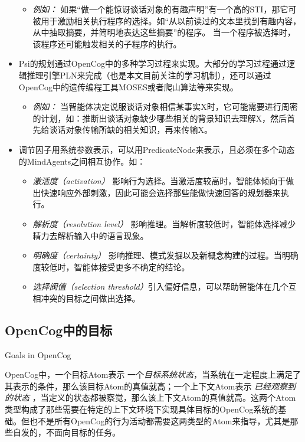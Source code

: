 \begin{itemize}
\begin{itemize}
\item {\it 例如：} 如果“做一个能惊讶谈话对象的有趣声明”有一个高的STI，那它可被用于激励相关执行程序的选择。如“从以前读过的文本里找到有趣内容，从中抽取摘要，并简明地表达这些摘要”的程序。 当一个程序被选择时，该程序还可能触发相关的子程序的执行。
\end{itemize}

\item Psi的规划通过OpenCog中的多种学习过程来实现。大部分的学习过程通过逻辑推理引擎PLN来完成（也是本文目前关注的学习机制），还可以通过OpenCog中的遗传编程工具MOSES或者爬山算法等来实现。
\begin{itemize}
\item {\it 例如：} 当智能体决定说服谈话对象相信某事实X时，它可能需要进行周密的计划，如：推断出谈话对象缺少哪些相关的背景知识去理解X，然后首先给谈话对象传输所缺的相关知识，再来传输X。

\end{itemize}

\item 调节因子用系统参数表示，可以用PredicateNode来表示，且必须在多个动态的MindAgents之间相互协作。如：
\begin{itemize}
\item {\it 激活度（activation）} 影响行为选择。当激活度较高时，智能体倾向于做出快速响应外部刺激，因此可能会选择那些能做快速回答的规划器来执行。
\item {\it 解析度（resolution level）} 影响推理。当解析度较低时，智能体选择减少精力去解析输入中的语言现象。
\item {\it 明确度（certainty）} 影响推理、模式发掘以及新概念构建的过程。当明确度较低时，智能体接受更多不确定的结论。
\item {\it 选择阀值（selection threshold）}引入偏好信息，可以帮助智能体在几个互相冲突的目标之间做出选择。
\end{itemize}
\end{itemize}

\subsection{OpenCog中的目标}{Goals in OpenCog}

OpenCog中，一个目标Atom表示 一个\textit{目标系统状态}，当系统在一定程度上满足了其表示的条件，那么该目标Atom的真值就高；一个上下文Atom表示 \textit{已经观察到的状态} ，当定义的状态都被察觉，那么该上下文Atom的真值就高。这两个Atom类型构成了那些需要在特定的上下文环境下实现具体目标的OpenCog系统的基础。但也不是所有OpenCog的行为活动都需要这两类型的Atom来指导，尤其是那些自发的，不面向目标的任务。


